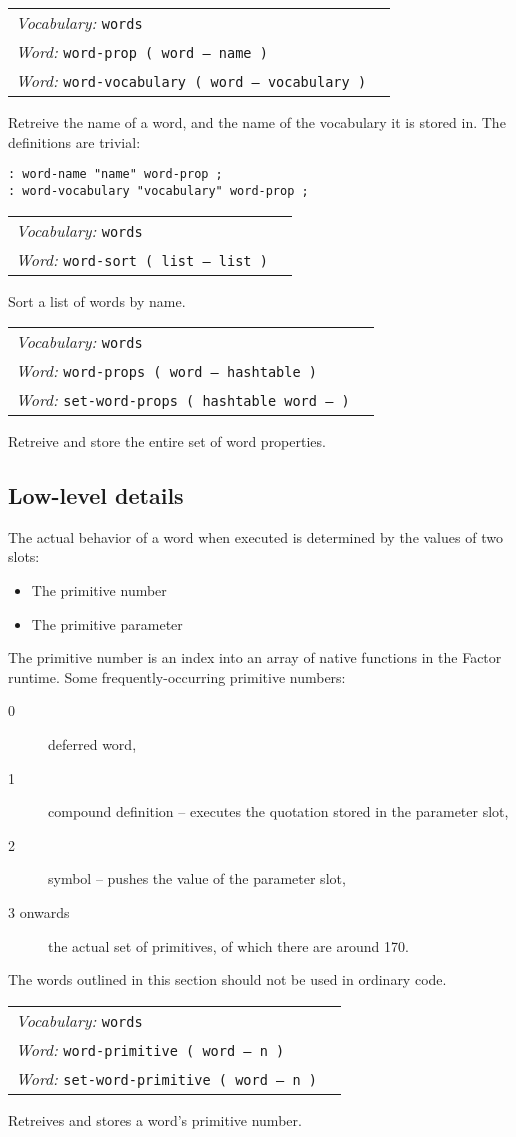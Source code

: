 \documentclass{book}
\newcommand{\vocabulary}[1]{\emph{Vocabulary:} \texttt{#1}&\\}
\newcommand{\ordinaryword}[2]{\index{\texttt{#1}}\emph{Word:} \texttt{#2}&\\}
\newcommand{\wordtable}[1]{


\begin{tabularx}{12cm}{lX}
\hline
#1
\hline
\end{tabularx}

}
\begin{document}
\wordtable{
\vocabulary{words}
\ordinaryword{word-name}{word-prop ( word -- name )}
\ordinaryword{word-vocabulary}{word-vocabulary ( word -- vocabulary )}

}
Retreive the name of a word, and the name of the vocabulary it is stored in. The definitions are trivial:
\begin{verbatim}
: word-name "name" word-prop ;
: word-vocabulary "vocabulary" word-prop ;
\end{verbatim}

\wordtable{
\vocabulary{words}
\ordinaryword{word-sort}{word-sort ( list -- list )}

}
Sort a list of words by name.

\wordtable{
\vocabulary{words}
\ordinaryword{word-props}{word-props ( word -- hashtable )}
\ordinaryword{set-word-props}{set-word-props ( hashtable word -- )}

}
Retreive and store the entire set of word properties.

\subsection{Low-level details}

The actual behavior of a word when executed is determined by the values of two slots:
\begin{itemize}
\item The primitive number
\item The primitive parameter
\end{itemize}
The primitive number is an index into an array of native functions in the Factor runtime.
Some frequently-occurring primitive numbers:
\begin{description}
\item[0] deferred word,
\item[1] compound definition -- executes the quotation stored in the parameter slot,
\item[2] symbol -- pushes the value of the parameter slot,
\item[3 onwards] the actual set of primitives, of which there are around 170.
\end{description}
The words outlined in this section should not be used in ordinary code.
\wordtable{
\vocabulary{words}
\ordinaryword{word-primitive}{word-primitive ( word -- n )}
\ordinaryword{set-word-primitive}{set-word-primitive ( word -- n )}

}
Retreives and stores a word's primitive number.
\end{document}
